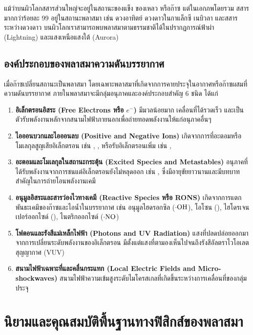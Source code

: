 แม้ว่าบนผิวโลกสสารส่วนใหญ่จะอยู่ในสถานะของแข็ง ของเหลว หรือก๊าซ แต่ในเอกภพโดยรวม สสารมากกว่าร้อยละ 99 อยู่ในสถานะพลาสมา เช่น ดวงอาทิตย์ ดวงดาวในกาแล็กซี เนบิวลา และสสารระหว่างดวงดาว บนผิวโลกเราสามารถพบพลาสมาตามธรรมชาติได้ในปรากฏการณ์ฟ้าผ่า (Lightning) และแสงเหนือแสงใต้ (Aurora)

\subsection{องค์ประกอบของพลาสมาความดันบรรยากาศ}

เมื่อก๊าซเปลี่ยนสถานะเป็นพลาสมา โดยเฉพาะพลาสมาที่เกิดจากการคายประจุในอากาศหรือก๊าซผสมที่ความดันบรรยากาศ ภายในพลาสมาจะมีกลุ่มอนุภาคและองค์ประกอบสำคัญ 6 ชนิด ได้แก่

\begin{enumerate}
    \item \textbf{อิเล็กตรอนอิสระ (Free Electrons หรือ $e^-$)} มีมวลน้อยมาก เคลื่อนที่ได้รวดเร็ว และเป็นตัวรับพลังงานหลักจากสนามไฟฟ้าภายนอกเพื่อถ่ายทอดพลังงานให้แก่อนุภาคอื่นๆ
    \item \textbf{ไอออนบวกและไอออนลบ (Positive and Negative Ions)} เกิดจากการที่อะตอมหรือโมเลกุลสูญเสียอิเล็กตรอน เช่น , ,  หรือรับอิเล็กตรอนเพิ่ม เช่น , 
    \item \textbf{อะตอมและโมเลกุลในสถานะกระตุ้น (Excited Species and Metastables)} อนุภาคที่ได้รับพลังงานจากการชนแต่อิเล็กตรอนยังไม่หลุดออก เช่น ,  ซึ่งมีอายุขัยยาวนานและมีบทบาทสำคัญในการถ่ายโอนพลังงานเคมี
    \item \textbf{อนุมูลอิสระและสารว่องไวทางเคมี (Reactive Species หรือ RONS)} เกิดจากการแตกพันธะเคมีของก๊าซและไอน้ำในบรรยากาศ เช่น อนุมูลไฮดรอกซิล ($\cdot\ce{OH}$), โอโซน (), ไฮโดรเจนเปอร์ออกไซด์ (), ไนตริกออกไซด์ ($\cdot\ce{NO}$)
    \item \textbf{โฟตอนและรังสีแม่เหล็กไฟฟ้า (Photons and UV Radiation)} แสงที่ปลดปล่อยออกมาจากการเปลี่ยนระดับพลังงานของอิเล็กตรอน มีตั้งแต่แสงที่ตามองเห็นไปจนถึงรังสีอัลตราไวโอเลตสุญญากาศ (VUV)
    \item \textbf{สนามไฟฟ้าเฉพาะที่และคลื่นกระแทก (Local Electric Fields and Micro-shockwaves)} สนามไฟฟ้าความเข้มสูงระดับไมโครสเกลที่เกิดขึ้นระหว่างการเคลื่อนที่ของกลุ่มประจุ
\end{enumerate}

\section{นิยามและคุณสมบัติพื้นฐานทางฟิสิกส์ของพลาสมา}

